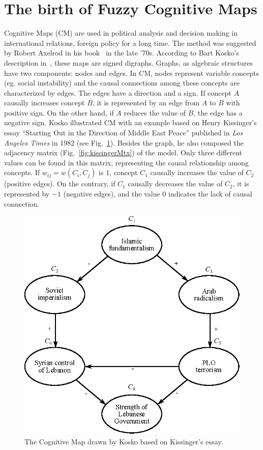 \documentclass[graybox]{svmult}
\begin{document}
\section{The birth of Fuzzy Cognitive Maps}
\label{sec:1}
Cognitive Maps (CM) are used in political analysis and decision making in international relations, foreign policy for a long time. The method was suggested by Robert Axelrod in his book~\cite{axelrod} in the late '70s. According to Bart Kosko's description in~\cite{b.kosko1986}, these maps are signed digraphs. Graphs, as algebraic structures have two components: nodes and edges. In CM, nodes represent variable concepts (eg. social instability) and the causal connections among these concepts are characterized by edges. The edges have a direction and a sign. If concept $A$ causally increases concept $B$, it is represented by an edge from $A$ to $B$ with positive sign. On the other hand, if $A$ reduces the value of $B$, the edge has a negative sign. Kosko illustrated CM with an example based on Henry Kissinger's essay ``Starting Out in the Direction of Middle East Peace'' published in \emph{Los Angeles Times} in 1982 (see Fig.~\ref{fig:kissingerCM}). Besides the graph, he also composed the adjacency matrix (Fig.~\ref{fig:kissingerMtx}) of the model. Only three different values can be found in this matrix, representing the causal relationship among concepts. If $w_{ij} = w(C_i, C_j)$ is 1, concept $C_1$ causally increases the value of $C_2$ (positive edges). On the contrary, if $C_1$ causally decreases the value of $C_2$, it is represented by $-1$ (negative edges), and the value 0 indicates the lack of causal connection.

\begin{figure}[hbt]
  \begin{center}
    \includegraphics[scale=1]{kissinger}
    \caption{The Cognitive Map drawn by Kosko based on Kissinger's essay.}
  \end{center}
  \label{fig:kissingerCM}
\end{figure}
\end{document}
